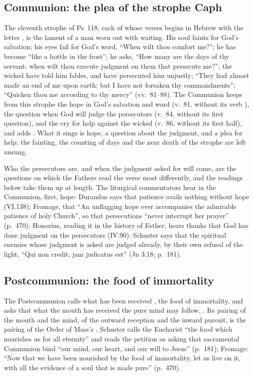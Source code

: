 \subsection{Communion: the plea of the strophe Caph}

The eleventh strophe of Ps~118, each of whose verses begins in Hebrew with the
letter , is the lament of a man worn out with waiting. His soul
faints for God's salvation; his eyes fail for God's word, ``When wilt thou
comfort me?''; he has become ``like a bottle in the frost''; he asks, ``How many
are the days of thy servant: when wilt thou execute judgment on them that
persecute me?''; the wicked have told him fables, and have persecuted him
unjustly; ``They had almost made an end of me upon earth: but I have not forsaken
thy commandments''; ``Quicken thou me according to thy mercy'' (vv.~81--88).
The Communion keeps from this strophe the hope in God's salvation and word
(v.~81, without its verb ), the question when God will judge the
persecutors (v.~84, without its first question), and the cry for help against
the wicked (v.~86, without its first half), and adds .
What it sings is hope, a question about the judgment, and a plea for help; the
fainting, the counting of days and the near death of the strophe are left
unsung.

Who the persecutors are, and when the judgment asked for will come, are the
questions on which the Fathers read the verse most differently, and the
readings below take them up at length. The liturgical commentators hear in the
Communion, first, hope: Durandus says that patience avails nothing without hope
(VI.138); Fromage, that ``An unflagging hope ever accompanies the admirable
patience of holy Church'', so that persecutions ``never interrupt her prayer''
(p.~470). Honorius, reading it in the history of Esther, hears thanks that God
has done judgment on the persecutors (IV.90). Schuster says that the spiritual
enemies whose judgment is asked are judged already, by their own refusal of the
light, ``Qui non credit, jam judicatus est'' (Jn 3:18; p.~181).

\subsection{Postcommunion: the food of immortality}

The Postcommunion calls what has been received ,
the food of immortality, and asks that what the mouth has received the pure
mind may follow, . Its pairing of the mouth and the
mind, of the outward reception and the inward pursuit, is the pairing of the
Order of Mass's . Schuster calls the Eucharist ``the
food which nourishes us for all eternity'' and reads the petition as asking that
sacramental Communion bind ``our mind, our heart, and our will to Jesus''
(p.~181); Fromage: ``Now that we have been nourished by the food of immortality,
let us live on it, with all the evidence of a soul that is made pure''
(p.~470).
